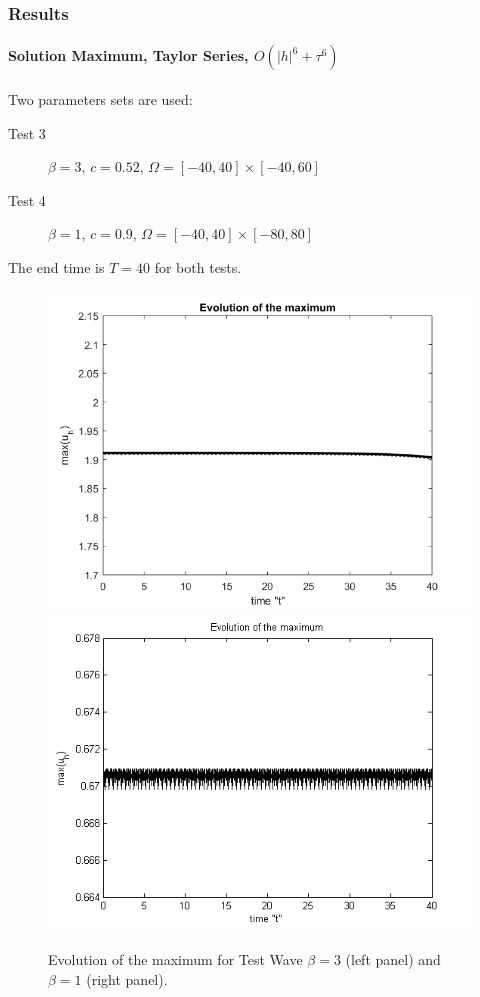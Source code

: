 \documentclass{beamer}
\begin{document}
\begin{frame}
\frametitle{Results}
\framesubtitle{Solution Maximum, Taylor Series, $O(|h|^6+\tau^6)$}

Two parameters sets are used:
\begin{description}
 \item[Test 3] $\beta = 3$, $c = 0.52$, $\Omega = [-40, 40] \times [-40, 60]$
 \item[Test 4] $\beta = 1$, $c = 0.9$, $\Omega = [-40, 40] \times [-80, 80]$
\end{description}
The end time is $T=40$ for both tests.
\begin{figure}[ht]
	\centering
	\begin{minipage}[b]{0.4\linewidth}
		\includegraphics[width=\linewidth]{figures/EvolutionOfMaximum_bt3_t40.png}
	\end{minipage}	
	\begin{minipage}[b]{0.4\linewidth}
		 \includegraphics[width=\linewidth]{figures/EvolutionOfMaximum_bt1_t40.png}
	\end{minipage}

Evolution of the maximum for Test Wave $\beta =3$ (left panel) and $\beta=1$ (right panel).
\end{figure}

\end{frame}
\end{document}
